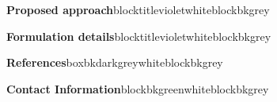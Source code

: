 \documentclass{beamer}
\begin{document}
\begin{frame}[t]
\begin{columns}[b]
\begin{column}{.46\textwidth}
				\begin{customblock}[10pt]{\textbf{Proposed approach}}{blocktitleviolet}{white}{blockbkgrey}
					
					\vspace{15cm}
					
				\end{customblock}
				
				\begin{customblock}[10pt]{\textbf{Formulation details}}{blocktitleviolet}{white}{blockbkgrey}
					
					\vspace{20cm}
					
				\end{customblock}
			
				\begin{customblock}[10pt]{\textbf{References}}{boxbkdarkgrey}{white}{blockbkgrey}
					
					\vspace{15cm}

				\end{customblock}
				
				\begin{customblock}[10pt]{\textbf{Contact Information}}{blockbkgreen}{white}{blockbkgrey}
					
					\Large{ 
						\color{boxbkseablue}
						\textbf{\getContactsList}
					}
				
					\vspace{5cm}
					
				\end{customblock}
			
			\end{column}
			
		\end{columns}
	
		\vskip1cm

	\end{frame}
\end{document}
